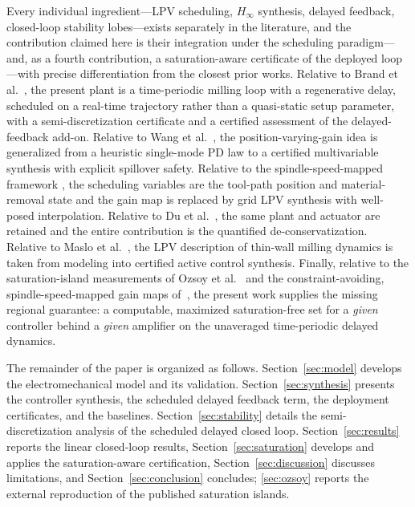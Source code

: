 \documentclass[preprint,12pt]{elsarticle}
\newcommand{\hinf}{H_\infty}
\begin{document}
Every individual ingredient---LPV scheduling, $\hinf$ synthesis, delayed
feedback, closed-loop stability lobes---exists separately in the
literature, and the contribution claimed here is their integration under
the scheduling paradigm---and, as a fourth contribution, a
saturation-aware certificate of the deployed loop---with precise
differentiation from the closest prior works. Relative to Brand et al.~\cite{brand2025lpv}, the present
plant is a time-periodic milling loop with a regenerative delay,
scheduled on a real-time trajectory rather than a quasi-static setup
parameter, with a semi-discretization certificate and a certified
assessment of the delayed-feedback add-on. Relative to Wang et al.~\cite{wang2019timespace}, the
position-varying-gain idea is generalized from a heuristic single-mode
PD law to a certified multivariable synthesis with explicit spillover
safety. Relative to the spindle-speed-mapped framework
\cite{jmp2026spindle}, the scheduling variables are the tool-path
position and material-removal state and the gain map is replaced by grid
LPV synthesis with well-posed interpolation. Relative to Du et
al.~\cite{du2024robust}, the same plant and actuator are retained and
the entire contribution is the quantified de-conservatization. Relative
to Maslo et al.~\cite{maslo2020improving}, the LPV description of
thin-wall milling dynamics is taken from modeling into certified active
control synthesis. Finally, relative to the saturation-island
measurements of Ozsoy et al.~\cite{ozsoy2025mssp} and the
constraint-avoiding, spindle-speed-mapped gain maps
of~\cite{jmp2026spindle}, the present work supplies the missing regional
guarantee: a computable, maximized saturation-free set for a
\emph{given} controller behind a \emph{given} amplifier on the
unaveraged time-periodic delayed dynamics.

The remainder of the paper is organized as follows.
Section~\ref{sec:model} develops the electromechanical model and its
validation. Section~\ref{sec:synthesis} presents the controller
synthesis, the scheduled delayed feedback term, the deployment
certificates, and the baselines. Section~\ref{sec:stability} details the
semi-discretization analysis of the scheduled delayed closed loop.
Section~\ref{sec:results} reports the linear closed-loop results,
Section~\ref{sec:saturation} develops and applies the saturation-aware
certification, Section~\ref{sec:discussion} discusses limitations, and
Section~\ref{sec:conclusion} concludes;
\ref{sec:ozsoy} reports the external reproduction of the
published saturation islands.
\end{document}

